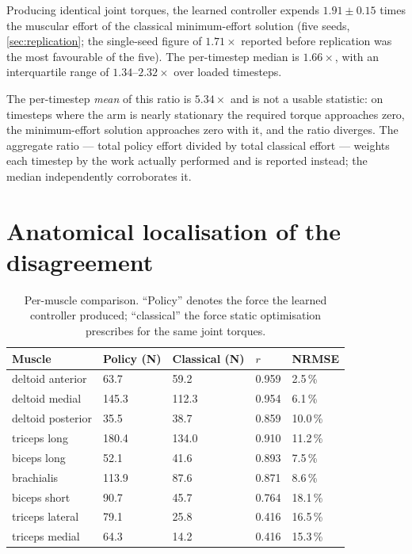 Producing identical joint torques, the learned controller expends
$1.91 \pm 0.15$ times the muscular effort of the classical minimum-effort
solution (five seeds, \cref{sec:replication}; the single-seed figure of
$1.71\times$ reported before replication was the most favourable of the five). The per-timestep
median is $1.66\times$, with an interquartile range of $1.34$--$2.32\times$ over
loaded timesteps.

The per-timestep \emph{mean} of this ratio is $5.34\times$ and is not a usable
statistic: on timesteps where the arm is nearly stationary the required torque
approaches zero, the minimum-effort solution approaches zero with it, and the
ratio diverges. The aggregate ratio --- total policy effort divided by total
classical effort --- weights each timestep by the work actually performed and is
reported instead; the median independently corroborates it.

\section{Anatomical localisation of the disagreement}

\begin{table}[H]
\centering
\caption{Per-muscle comparison. ``Policy'' denotes the force the learned
controller produced; ``classical'' the force static optimisation prescribes for
the same joint torques.}
\small
\begin{tabular}{@{} L{3.6cm} R{2.4cm} R{2.4cm} R{1.8cm} R{2.0cm} @{}}
\toprule
\textbf{Muscle} & \textbf{Policy (N)} & \textbf{Classical (N)} & \textbf{$r$} & \textbf{NRMSE} \\
\midrule
deltoid anterior  &  63.7 &  59.2 & 0.959 &  2.5\,\% \\
deltoid medial    & 145.3 & 112.3 & 0.954 &  6.1\,\% \\
deltoid posterior &  35.5 &  38.7 & 0.859 & 10.0\,\% \\
triceps long      & 180.4 & 134.0 & 0.910 & 11.2\,\% \\
biceps long       &  52.1 &  41.6 & 0.893 &  7.5\,\% \\
brachialis        & 113.9 &  87.6 & 0.871 &  8.6\,\% \\
biceps short      &  90.7 &  45.7 & 0.764 & 18.1\,\% \\
triceps lateral   &  79.1 &  25.8 & 0.416 & 16.5\,\% \\
triceps medial    &  64.3 &  14.2 & 0.416 & 15.3\,\% \\
\bottomrule
\end{tabular}
\label{tab:permuscle}
\end{table}

